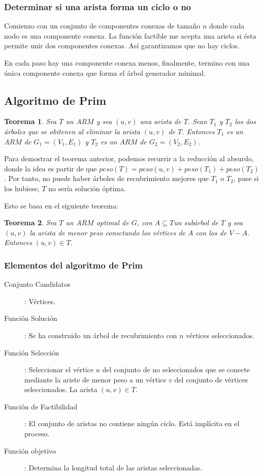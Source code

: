 \documentclass[10pt,a4paper,spanish]{report}
\newtheorem{thm}{Teorema}[section]
\theoremstyle{definition}
\theoremstyle{remark}
\begin{document}
\subsubsection{\textcolor{electriccrimson}Determinar si una arista forma un ciclo o no}

Comienzo con un conjunto de componentes conexas de tamaño $n$ donde cada nodo es una componente conexa. La función factible me acepta una arista si ésta permite unir dos componentes conexas. Así garantizamos que no hay ciclos.

En cada paso hay una componente conexa menos, finalmente, termino con una única componente conexa que forma el árbol generador minimal.

\subsection{\textcolor{electriccrimson}Algoritmo de Prim}
\label{algprim}

\begin{thm}
    Sea $T$ un $ARM$ y sea $(u,v)$ una arista de $T$. Sean $T_1$ y $T_2$ los dos árboles que se obitenen al eliminar la arista $(u,v)$ de $T$. Entonces $T_1$ es un $ARM$ de $G_1 = (V_1,E_1)$ y $T_2$ es un $ARM$ de $G_2 = (V_2,E_2)$.
\end{thm}

Para demostrar el teorema anterior, podemos recurrir a la reducción al absurdo, donde la idea es partir de que $peso(T) =peso(u,v) + peso(T_1) + peso(T_2)$. Por tanto, no puede haber árboles de recubrimiento mejores que $T_1$ o $T_2$, puse si los hubiese, $T$ no sería solución óptima.

Esto se basa en el siguiente teorema:

\begin{thm}
    Sea $T$ un $ARM$ optimal de $G$, con $A \subseteq T $un subárbol de $T$ y sea $(u,v)$ la arista de menor peso conectando los vértices de $A$ con los de $V-A$. Entonces $(u,v) \in T$.
\end{thm}

\subsubsection{\textcolor{electriccrimson}Elementos del algoritmo de Prim}

\begin{description}
    \item[Conjunto Candidatos]: Vértices.
    \item[Función Solución]: Se ha construido un árbol de recubrimiento con $n$ vértices seleccionados.
    \item[Función Selección]: Seleccionar el vértice $u$ del conjunto de no seleccionados que se conecte mediante la ariste de menor peso a un vértice $v$ del conjunto de vértices seleccionados. La arista $(u,v) \in T$.
    \item[Función de Factibilidad]: El conjunto de aristas no contiene ningún ciclo. Está implícita en el proceso.
    \item[Función objetivo]: Determina la longitud total de las aristas seleccionadas.
\end{description}
\end{document}

